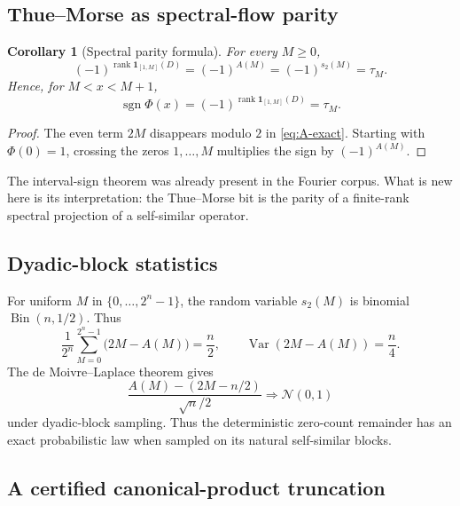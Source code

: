 \documentclass[11pt,oneside]{article}
\numberwithin{equation}{section}
\theoremstyle{plain}
\newtheorem{corollary}[theorem]{Corollary}
\theoremstyle{definition}
\theoremstyle{remark}
\newcommand{\sgn}{\operatorname{sgn}}
\newcommand{\rank}{\operatorname{rank}}
\newcommand{\tm}{\tau}
\begin{document}
\subsection{Thue--Morse as spectral-flow parity}

\begin{corollary}[Spectral parity formula]\label{cor:spectral-parity}
For every $M\ge0$,
\begin{equation}\label{eq:spectral-parity}
 \boxed{\ (-1)^{\rank\mathbf 1_{[1,M]}(D)}=(-1)^{A(M)}
 =(-1)^{s_2(M)}=\tm_M.\ }
\end{equation}
Hence, for $M<x<M+1$,
\[
 \sgn\Phi(x)=(-1)^{\rank\mathbf 1_{[1,M]}(D)}=\tm_M.
\]
\end{corollary}

\begin{proof}
The even term $2M$ disappears modulo $2$ in \cref{eq:A-exact}.  Starting with $\Phi(0)=1$, crossing the zeros $1,\ldots,M$ multiplies the sign by $(-1)^{A(M)}$.
\end{proof}

The interval-sign theorem was already present in the Fourier corpus.  What is new here is its interpretation: the Thue--Morse bit is the parity of a finite-rank spectral projection of a self-similar operator.

\subsection{Dyadic-block statistics}

For uniform $M$ in $\{0,\ldots,2^n-1\}$, the random variable $s_2(M)$ is binomial $\operatorname{Bin}(n,1/2)$.  Thus
\begin{equation}\label{eq:block-mean}
 \frac1{2^n}\sum_{M=0}^{2^n-1}\bigl(2M-A(M)\bigr)=\frac n2,
 \qquad
 \operatorname{Var}(2M-A(M))=\frac n4.
\end{equation}
The de Moivre--Laplace theorem gives
\begin{equation}\label{eq:count-clt}
 \frac{A(M)-(2M-n/2)}{\sqrt n/2}
 \Longrightarrow \mathcal N(0,1)
\end{equation}
under dyadic-block sampling.  Thus the deterministic zero-count remainder has an exact probabilistic law when sampled on its natural self-similar blocks.

\subsection{A certified canonical-product truncation}
\end{document}
